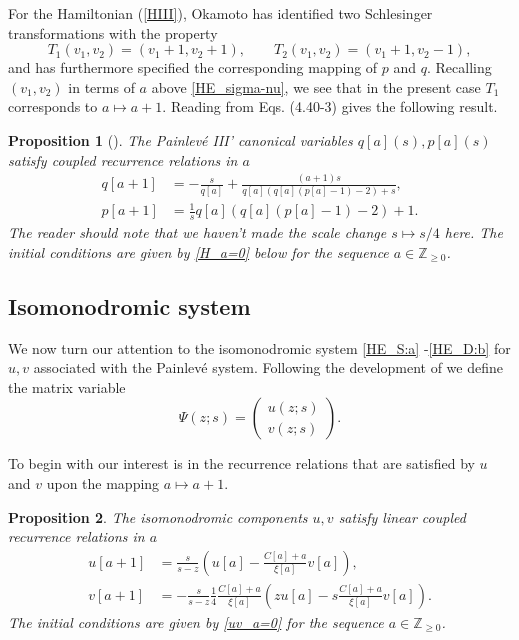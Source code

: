 \documentclass[10pt,reqno]{amsart}
\theoremstyle{plain}
\newtheorem{proposition}{Proposition}
\theoremstyle{definition}
\theoremstyle{remark}
\begin{document}
For the Hamiltonian (\ref{HIII}), Okamoto \cite{Ok_1987c} has identified two Schlesinger
transformations with the property
\begin{equation}\label{T}
  T_1(v_1, v_2) = (v_1+1, v_2+1),  \qquad
  T_2(v_1, v_2) = (v_1+1, v_2 - 1),
\end{equation}
and has furthermore specified the corresponding mapping of $p$ and $q$. Recalling $(v_1,v_2)$ in terms of $a$ above 
\eqref{HE_sigma-nu}, we see that in the present case $T_1$ corresponds to $a \mapsto a + 1$. Reading from \cite{FW_2002a}
Eqs. (4.40-3) gives the following result.

\begin{proposition}[{\cite[Eqs. (4.40-3)]{FW_2002a}}]\label{recurHam}    
The Painlev\'e III' canonical variables $ q[a](s), p[a](s) $ satisfy coupled recurrence relations in $ a $
\begin{align}
 q[a+1] & = -\frac{s}{q[a]}+\frac{(a+1)s}{q[a]\left(q[a]\left(p[a]-1\right)-2\right)+s} ,
\\
 p[a+1] & = \frac{1}{s}q[a]\left(q[a]\left(p[a]-1\right)-2\right)+1 .
\end{align}
The reader should note that we haven't made the scale change $ s \mapsto s/4 $ here.
The initial conditions are given by \eqref{H_a=0} below for the sequence $ a \in {\mathbb Z}_{{\geqslant} 0} $.
\end{proposition}

\subsection{Isomonodromic system}\label{SS:HE_isomonodromy}
We now turn our attention to the isomonodromic system \eqref{HE_S:a} -\eqref{HE_D:b} for $u,v$ associated with the Painlev\'e system. 
Following the development of \cite{FW_2007} we define the matrix variable
\begin{equation}
   \Psi(z;s) = \begin{pmatrix} u(z;s) \\ v(z;s) \end{pmatrix} .
\label{HE_Psi}
\end{equation}

To begin with our interest is in the recurrence relations that are satisfied by $u$ and $v$ upon the 
mapping $a \mapsto a+1$.
\begin{proposition}\label{recurLax}
The isomonodromic components $ u, v $ satisfy linear coupled recurrence relations in $ a $
\begin{align}
 u[a+1] & = \frac{s}{s-z}\left(u[a]-\frac{C[a]+a}{\xi[a]}v[a]\right) ,
\label{HE_uST}
\\
 v[a+1] & = -\frac{s}{s-z}\frac{1}{4}\frac{C[a]+a}{\xi[a]}\left(z u[a]-s\frac{C[a]+a}{\xi[a]}v[a]\right) .
\label{HE_vST}
\end{align}
The initial conditions are given by \eqref{uv_a=0} for the sequence $ a \in {\mathbb Z}_{{\geqslant} 0} $.
\end{proposition}
\end{document}
